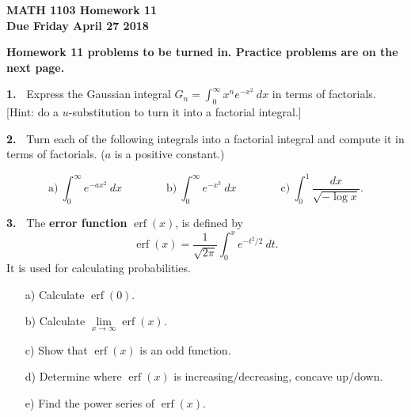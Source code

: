 \documentclass[12pt]{article}
\theoremstyle{definition}
\theoremstyle{remark}
\theoremstyle{definition}
\newenvironment{Solution}{\noindent\textbf{Solution.}}{}
\DeclareMathOperator{\erf}{erf}
\begin{document}
  

{\bf MATH 1103 Homework 11}\\
{\bf Due Friday April 27 2018}



 {\bf Homework 11 problems to be turned in. Practice problems are on the next page.}




{\bf 1.\ } Express the Gaussian integral $G_{n}=\int_0^{\infty} x^n e^{-x^2}\ dx$ in terms of factorials. [Hint: do a $u$-substitution to turn it into a factorial integral.]




{\bf 2.\ } Turn each of the following integrals into a factorial integral and compute it in terms of factorials. ($a$ is a positive constant.)

\[ \text{a)}\ \int_0^\infty e^{-ax^2}\ dx \qquad\qquad
 \text{b)}\ \int_0^\infty e^{-x^3}\ dx\qquad \qquad
 \text{c)}\ \int_0^1\frac{dx}{\sqrt{-\log x}}.
\]





{\bf 3.\ } The {\bf error function} $\erf(x)$, is defined by 
\[\erf(x)=\frac{1}{\sqrt{2\pi}}\int_0^x e^{-t^2/2}\ dt.\]
It is used for calculating probabilities. 

\begin{enumerate}
\item[a)] Calculate $\erf(0)$. 
\item[b)] Calculate $\lim\limits_{x\to\infty}\erf(x)$.
\item[c)] Show that $\erf(x)$ is an odd function. 
\item[d)] Determine where $\erf(x)$ is increasing/decreasing, concave up/down. 
\item[e)] Find the power series of $\erf(x)$. 
\end{enumerate}
\end{document}

